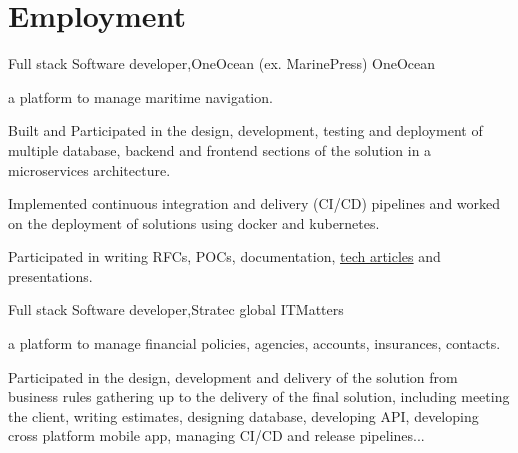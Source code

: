 \section{Employment}
  \resumeSubHeadingListStart
    \resumeSubheading
    {Full stack Software developer,}{OneOcean (ex. MarinePress)}{}
    {}
      \resumeItemListStart
      \renewcommand{\labelitemii}{\raisebox{.85cm}{$\bullet$}}
        \resumeItem
          {OneOcean} {a platform to manage maritime navigation.

          Built and Participated in the design, development, testing and deployment of multiple database, backend and frontend 
          sections of the solution in a microservices architecture. 
          
          Implemented continuous integration and delivery (CI/CD) pipelines and worked on the deployment of solutions using 
          docker and kubernetes.

          Participated in writing RFCs, POCs, documentation, \href{https://medium.com/oneoceangroup/publishing-and-consuming-debugging-symbols-for-net-core-library-d0e831f5862}{tech articles} and presentations.
          }
        \renewcommand{\labelitemii}{\scriptsize \raisebox{.25cm}{\ding{118}}}
      \resumeItemListEnd

    \resumeSubheading
    {Full stack Software developer,}{Stratec global}{}
    {}
      \resumeItemListStart
      \renewcommand{\labelitemii}{\raisebox{.65cm}{$\bullet$}}
        \resumeItem
         {ITMatters} {a platform to manage financial policies, agencies, accounts, insurances, contacts.

         Participated in the design, development and delivery of the solution from business rules gathering 
         up to the delivery of the final solution, including meeting the client, writing estimates, designing database, 
         developing API, developing cross platform mobile app, managing CI/CD and release pipelines...}
        \renewcommand{\labelitemii}{\scriptsize \raisebox{.25cm}{\ding{118}}}
      \resumeItemListEnd
    
